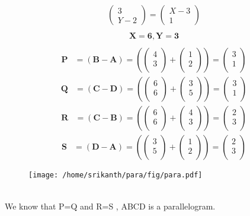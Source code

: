 \documentclass[12pt]{article}
\providecommand{\brak}[1]{\ensuremath{\left(#1\right)}}
\newcommand{\myvec}[1]{\ensuremath{\begin{pmatrix}#1\end{pmatrix}}}
\let\vec\mathbf
\begin{document}
 \begin{align} 
 \myvec{3\\Y-2}=\myvec{X-3\\1}\\
 \end{align}
 \begin{align} 
 \vec{X=6},\vec{Y=3}\\
 \end{align}
 \begin{align}
 \vec{P} &= \brak{\vec{B}-\vec{A}} = \brak{\myvec{
  4 \\
  3 \\
 } + \myvec{
  1 \\
  2\\
 } 
 } = \myvec{
 3\\
 1\\
 }  
 \end{align}
 \begin{align}
 \vec{Q} &= \brak{\vec{C}-\vec{D}} = \brak{\myvec{
  6 \\
  6 \\
 } + \myvec{
  3 \\
  5\\
 } 
 } = \myvec{
 3\\
 1\\
 }
 \end{align}
 \begin{align}
 \vec{R} &= \brak{\vec{C}-\vec{B}} = \brak{\myvec{
  6 \\
  6 \\
 } + \myvec{
  4 \\
  3\\
 } 
 } = \myvec{
 2\\
 3\\
 } 
 \end{align}
 \begin{align}
 \vec{S} &= \brak{\vec{D}-\vec{A}} = \brak{\myvec{
  3 \\
  5 \\
 } + \myvec{
  1 \\
  2\\
 } 
 } = \myvec{
 2\\
 3\\
 } 
\end{align}
\begin{figure}[h!]
	\begin{center}
  \texttt{[image: /home/srikanth/para/fig/para.pdf]}
	\end{center}
\caption{}
\label{fig:Fig3}
\end{figure}\\
We know that P=Q and R=S , ABCD is a parallelogram. 
\
\end{document}
